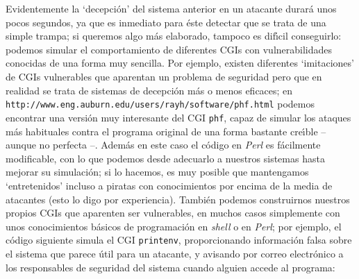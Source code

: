 Evidentemente la `decepci\'on' del sistema anterior en un atacante durar\'a
unos pocos segundos, ya que es inmediato para \'este detectar que se trata de
una simple trampa; si queremos algo m\'as elaborado, tampoco es dif\'{\i}cil 
conseguirlo: podemos simular el comportamiento de diferentes CGIs con 
vulnerabilidades conocidas de una forma muy sencilla. Por ejemplo, existen 
diferentes `imitaciones' de CGIs vulnerables que aparentan un problema de 
seguridad pero que en realidad se trata de sistemas de decepci\'on m\'as o 
menos eficaces; en {\tt
http://www.eng.auburn.edu/users/rayh/software/phf.html} podemos encontrar una
versi\'on muy interesante del CGI {\tt phf}, capaz de simular los ataques m\'as 
habituales contra el programa original de
una forma bastante cre\'{\i}ble -- aunque no perfecta --. Adem\'as en este
caso el c\'odigo en {\it Perl} es f\'acilmente modificable, con lo que podemos 
desde adecuarlo a nuestros sistemas hasta mejorar su simulaci\'on; si lo
hacemos, es muy posible que mantengamos `entretenidos' incluso a piratas con
conocimientos por encima de la media de atacantes (esto lo digo por 
experiencia). Tambi\'en podemos construirnos nuestros propios CGIs que 
aparenten ser vulnerables, en muchos casos simplemente con unos conocimientos 
b\'asicos de programaci\'on en {\it shell} o en {\it Perl}; por ejemplo, el
c\'odigo siguiente simula el CGI {\tt printenv}, proporcionando informaci\'on 
falsa sobre el sistema que parece \'util para un atacante, y avisando por correo
electr\'onico a los responsables de seguridad del sistema cuando alguien 
accede al programa:
